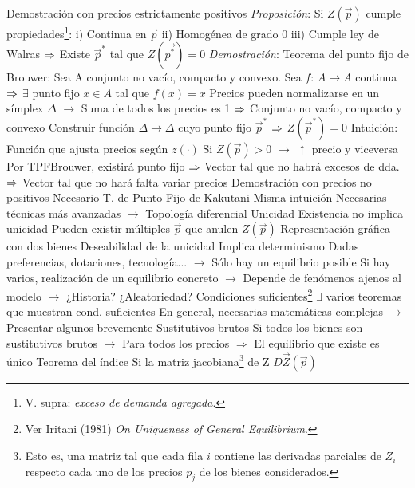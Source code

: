 \documentclass{nuevotema}
\begin{document}
\begin{esquemal}
				\4 Demostración con precios estrictamente positivos
				\4[] \textit{Proposición}:
				\4[] Si $Z(\vec{p})$ cumple propiedades\footnote{V. supra: \textit{exceso de demanda agregada}.}:
				\4[] i) Continua en $\vec{p}$
				\4[] ii) Homogénea de grado 0
				\4[] iii) Cumple ley de Walras
				\4[] $\Rightarrow$ Existe $\vec{p}^*$ tal que $Z(\vec{p^*}) = 0$
				\4[] \textit{Demostración}:
				\4[] Teorema del punto fijo de Brouwer:
				\4[] \quad Sea A conjunto no vacío, compacto y convexo.
				\4[] \quad Sea $f: \, A \to A$ continua
				\4[] \quad $\Rightarrow$ $\exists$ punto fijo $x \in A$ tal que $f(x) = x$
				\4[] Precios pueden normalizarse en un símplex $\Delta$
				\4[] $\to$ Suma de todos los precios es 1
				\4[] $\Rightarrow$ Conjunto no vacío, compacto y convexo
				\4[] Construir función $\Delta \to \Delta$
				\4[] \quad cuyo punto fijo $\vec{p}^*$ $\Rightarrow$ $Z(\vec{p}^*) = 0$
				\4[] Intuición:
				\4[] \quad Función que ajusta precios según $z(\cdot)$
				\4[] \quad Si $Z(\vec{p}) > 0$ $\to$ $\uparrow$ precio y viceversa
				\4[] \quad Por TPFBrouwer, existirá punto fijo
				\4[] \quad $\Rightarrow$ Vector tal que no habrá excesos de dda.
				\4[] \quad $\Rightarrow$ Vector tal que no hará falta variar precios
				\4 Demostración con precios no positivos
				\4[] Necesario T. de Punto Fijo de Kakutani
				\4[] Misma intuición
				\4[] Necesarias técnicas más avanzadas
				\4[] $\to$ Topología diferencial
			\3 Unicidad
				\4 Existencia no implica unicidad
				\4[] Pueden existir múltiples $\vec{p}$ que anulen $Z(\vec{p})$
				\4[] Representación gráfica con dos bienes
				\4[] 
				\4 Deseabilidad de la unicidad
				\4[] Implica determinismo
				\4[] Dadas preferencias, dotaciones, tecnología...
				\4[] $\to$ Sólo hay un equilibrio posible
				\4[] Si hay varios, realización de un equilibrio concreto
				\4[] $\to$ Depende de fenómenos ajenos al modelo
				\4[] $\to$ ¿Historia? ¿Aleatoriedad?
				\4 Condiciones suficientes\footnote{Ver Iritani (1981) \textit{On Uniqueness of General Equilibrium}.}
				\4[] $\exists$ varios teoremas que muestran cond. suficientes
				\4[] En general, necesarias matemáticas complejas
				\4[] $\to$ Presentar algunos brevemente
				\4 Sustitutivos brutos
				\4[] Si todos los bienes son sustitutivos brutos
				\4[] $\to$ Para todos los precios
				\4[] $\Rightarrow$ El equilibrio que existe es único
				\4 Teorema del índice
				\4[] Si la matriz jacobiana\footnote{Esto es, una matriz tal que cada fila $i$ contiene las derivadas parciales de $Z_i$ respecto cada uno de los precios $p_j$ de los bienes considerados.} de Z $D\vec{Z}(\vec{p})$

\end{esquemal}
\end{document}
